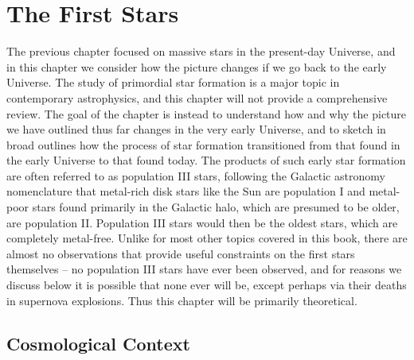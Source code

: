 \chapter{The First Stars}
\label{ch:first_stars}


The previous chapter focused on massive stars in the present-day Universe, and in this chapter we consider how the picture changes if we go back to the early Universe. The study of primordial star formation is a major topic in contemporary astrophysics, and this chapter will not provide a comprehensive review. The goal of the chapter is instead to understand how and why the picture we have outlined thus far changes in the very early Universe, and to sketch in broad outlines how the process of star formation transitioned from that found in the early Universe to that found today. The products of such early star formation are often referred to as population III stars, following the Galactic astronomy nomenclature that metal-rich disk stars like the Sun are population I and metal-poor stars found primarily in the Galactic halo, which are presumed to be older, are population II. Population III stars would then be the oldest stars, which are completely metal-free. Unlike for most other topics covered in this book, there are almost no observations that provide useful constraints on the first stars themselves -- no population III stars have ever been observed, and for reasons we discuss below it is possible that none ever will be, except perhaps via their deaths in supernova explosions. Thus this chapter will be primarily theoretical.

\section{Cosmological Context}


